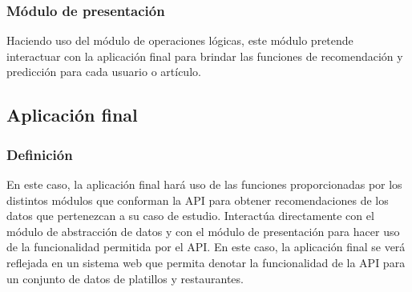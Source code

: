   \subsubsection{Módulo de presentación}
    Haciendo uso del módulo de operaciones lógicas, este módulo pretende interactuar con la aplicación final para brindar las funciones de recomendación y predicción para cada usuario o artículo. 

\subsection{Aplicación final}
  \subsubsection{Definición}
    En este caso, la aplicación final hará uso de las funciones proporcionadas por los distintos módulos que conforman la API para obtener recomendaciones de los datos que pertenezcan a su caso de estudio. Interactúa directamente con el módulo de abstracción de datos y con el módulo de presentación para hacer uso de la funcionalidad permitida por el API. En este caso, la aplicación final se verá reflejada en un sistema web que permita denotar la funcionalidad de la API para un conjunto de datos de platillos y restaurantes.
